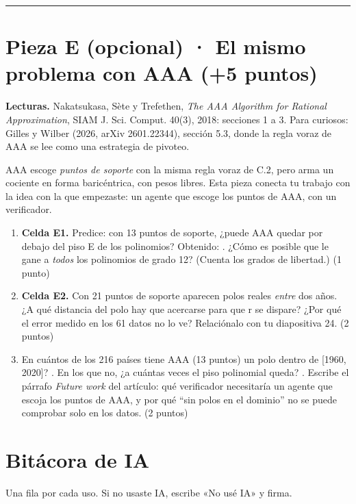\begin{center}\rule{0.5\linewidth}{0.5pt}\end{center}

\section{Pieza E (opcional) · El mismo problema con AAA (+5 puntos)}

\textbf{Lecturas.} Nakatsukasa, Sète y Trefethen, \emph{The AAA Algorithm for Rational Approximation}, SIAM J. Sci. Comput. 40(3), 2018: secciones 1 a 3. Para curiosos: Gilles y Wilber (2026, arXiv 2601.22344), sección 5.3, donde la regla voraz de AAA se lee como una estrategia de pivoteo.

AAA escoge \emph{puntos de soporte} con la misma regla voraz de C.2, pero arma un cociente en forma baricéntrica, con pesos libres. Esta pieza conecta tu trabajo con la idea con la que empezaste: un agente que escoge los puntos de AAA, con un verificador.

\begin{enumerate}
\def\labelenumi{(\alph{enumi})}
\item \textbf{Celda E1.} Predice: con 13 puntos de soporte, ¿puede AAA quedar por debajo del piso E de los polinomios?  Obtenido: . ¿Cómo es posible que le gane a \emph{todos} los polinomios de grado 12? (Cuenta los grados de libertad.) (1 punto)
\item \textbf{Celda E2.} Con 21 puntos de soporte aparecen polos reales \emph{entre} dos años. ¿A qué distancia del polo hay que acercarse para que r se dispare? ¿Por qué el error medido en los 61 datos no lo ve? Relaciónalo con tu diapositiva 24. (2 puntos)
\item En cuántos de los 216 países tiene AAA (13 puntos) un polo dentro de [1960, 2020]? . En los que no, ¿a cuántas veces el piso polinomial queda? . Escribe el párrafo \emph{Future work} del artículo: qué verificador necesitaría un agente que escoja los puntos de AAA, y por qué ``sin polos en el dominio'' no se puede comprobar solo en los datos. (2 puntos)
\end{enumerate}


\section{Bitácora de IA}

Una fila por cada uso. Si no usaste IA, escribe «No usé IA» y firma.

